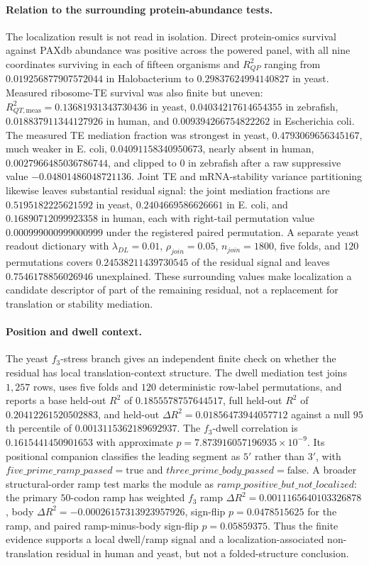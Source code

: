 \paragraph{Relation to the surrounding protein-abundance tests.}
The localization result is not read in isolation.  Direct protein-omics survival against PAXdb abundance was positive across the powered panel, with all nine coordinates surviving in each of fifteen organisms and $R^2_{QP}$ ranging from $0.019256877907572044$ in Halobacterium to $0.29837624994140827$ in yeast.  Measured ribosome-TE survival was also finite but uneven: $R^2_{QT,\mathrm{meas}}=0.13681931343730436$ in yeast, $0.04034217614654355$ in zebrafish, $0.018837911344127926$ in human, and $0.009394266754822262$ in Escherichia coli.  The measured TE mediation fraction was strongest in yeast, $0.4793069656345167$, much weaker in E. coli, $0.04091158340950673$, nearly absent in human, $0.0027966485036786744$, and clipped to $0$ in zebrafish after a raw suppressive value $-0.04801486048721136$.  Joint TE and mRNA-stability variance partitioning likewise leaves substantial residual signal: the joint mediation fractions are $0.5195182225621592$ in yeast, $0.2404669586626661$ in E. coli, and $0.16890712099923358$ in human, each with right-tail permutation value $0.000999000999000999$ under the registered paired permutation.  A separate yeast readout dictionary with $\lambda_{DL}=0.01$, $\rho_{join}=0.05$, $n_{join}=1800$, five folds, and $120$ permutations covers $0.24538211439730545$ of the residual signal and leaves $0.7546178856026946$ unexplained.  These surrounding values make localization a candidate descriptor of part of the remaining residual, not a replacement for translation or stability mediation.

\paragraph{Position and dwell context.}
The yeast $f_3$-stress branch gives an independent finite check on whether the residual has local translation-context structure.  The dwell mediation test joins $1{,}257$ rows, uses five folds and $120$ deterministic row-label permutations, and reports a base held-out $R^2$ of $0.1855578757644517$, full held-out $R^2$ of $0.20412261520502883$, and held-out $\Delta R^2=0.01856473944057712$ against a null $95$th percentile of $0.0013115362189692937$.  The $f_3$-dwell correlation is $0.1615441450901653$ with approximate $p=7.873916057196935\times 10^{-9}$.  Its positional companion classifies the leading segment as $5'$ rather than $3'$, with $five\_prime\_ramp\_passed=\mathrm{true}$ and $three\_prime\_body\_passed=\mathrm{false}$.  A broader structural-order ramp test marks the module as $ramp\_positive\_but\_not\_localized$: the primary $50$-codon ramp has weighted $f_3$ ramp $\Delta R^2=0.0011165640103326878$, body $\Delta R^2=-0.00026157313923957926$, sign-flip $p=0.0478515625$ for the ramp, and paired ramp-minus-body sign-flip $p=0.05859375$.  Thus the finite evidence supports a local dwell/ramp signal and a localization-associated non-translation residual in human and yeast, but not a folded-structure conclusion.


